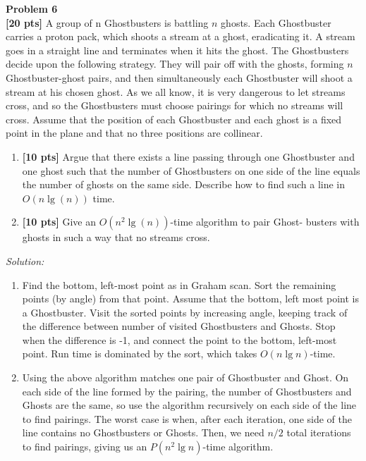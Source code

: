 \documentclass{article}
\newenvironment{problem}[2][Problem]
    { \begin{mdframed}[backgroundcolor=gray!20] \textbf{#1 #2} \\}
    {  \end{mdframed}}
\newenvironment{solution}
    {\textit{Solution:}}
    {}
\begin{document}
\newpage
\begin{problem}{6}
\textbf{[20 pts]}
A group of n Ghostbusters is battling $n$ ghosts. Each Ghostbuster carries a proton pack, which shoots a stream at a ghost, eradicating it. A stream goes in a straight line and terminates when it hits the ghost. The Ghostbusters decide upon the following strategy. They will pair off with the ghosts, forming $n$ Ghostbuster-ghost pairs, and then simultaneously each Ghostbuster will shoot a stream at his chosen ghost. As we all know, it is very dangerous to let streams cross, and so the Ghostbusters must choose pairings for which no streams will cross. Assume that the position of each Ghostbuster and each ghost is a fixed point in the plane and that no three positions are collinear.
\begin{enumerate}
	\item\textbf{[10 pts]} Argue that there exists a line passing through one Ghostbuster and one ghost such that the number of Ghostbusters on one side of the line equals the number of ghosts on the same side. Describe how to find such a line in $O(n \lg (n))$ time.
	\item\textbf{[10 pts]} Give an $O(n^2 \lg (n))$-time algorithm to pair Ghost- busters with ghosts in such a way that no streams cross.
\end{enumerate}
\end{problem}
\begin{solution}	
	\begin{enumerate}
		\item Find the bottom, left-most point as in Graham scan. Sort the remaining points (by angle) from that point. Assume that the bottom, left most point is a Ghostbuster. Visit the sorted points by increasing angle, keeping track of the difference between number of visited Ghostbusters and Ghosts. Stop when the difference is -1, and connect the point to the bottom, left-most point. Run time is dominated by the sort, which takes $O(n \lg n)$-time.
		\item Using the above algorithm matches one pair of Ghostbuster and Ghost. On each side of the line formed by the pairing, the number of Ghostbusters and Ghosts are the same, so use the algorithm recursively on each side of the line to find pairings. The worst case is when, after each iteration, one side of the line contains no Ghostbusters or Ghosts. Then, we need $n/2$ total iterations to find pairings, giving us an $P(n^2 \lg n)$-time algorithm.
	\end{enumerate}
\end{solution}
\end{document}
